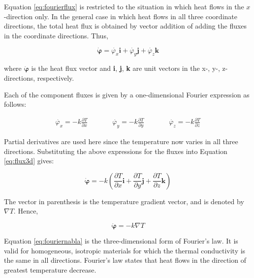 Equation \eqref{eq:fourierflux} is restricted to the situation in which heat flows in the $x$-direction
only. In the general case in which heat flows in all three coordinate directions, the total heat flux is obtained by vector addition of adding the fluxes in the coordinate directions. Thus,

\begin{equation}
	\label{eq:flux3d}
	\boldsymbol{\dot{\varphi}} = \dot{\varphi_x} \mathbf{i} + \dot{\varphi_y} \mathbf{j} + \dot{\varphi_z} \mathbf{k}
\end{equation}

where $\boldsymbol{\dot{\varphi}}$ is the heat flux vector and \textbf{i}, \textbf{j}, \textbf{k} are unit vectors in the x-, y-, z-directions, respectively.

Each of the component fluxes is given by a one-dimensional Fourier expression as follows:

\begin{equation}
	\begin{aligned}
		\label{eq:fourier3d}
		\dot{\varphi_x} = - k \frac{\partial T}{\partial x} & \qquad & \dot{\varphi_y} = - k \frac{\partial T}{\partial y} & \qquad & \dot{\varphi_z} = - k \frac{\partial T}{\partial z}
	\end{aligned}
\end{equation}

Partial derivatives are used here since the temperature now varies in all three directions. Substituting
the above expressions for the fluxes into Equation \eqref{eq:flux3d} gives:

\begin{equation}
	\label{eq:fouriercart}
	\boldsymbol{\dot{\varphi}} = -k \left(\frac{\partial T}{\partial x} \mathbf{i} + \frac{\partial T}{\partial y} \mathbf{j} + \frac{\partial T}{\partial z} \mathbf{k} \right)
\end{equation}

The vector in parenthesis is the temperature gradient vector, and is denoted by $\nabla T$. Hence,

\begin{equation}
	\label{eq:fouriernabla}
	\boldsymbol{\dot{\varphi}} = -k \nabla T
\end{equation}

Equation \eqref{eq:fouriernabla} is the three-dimensional form of Fourier’s law. It is valid for homogeneous, isotropic materials for which the thermal conductivity is the same in all directions. Fourier’s law states that heat flows in the direction of greatest temperature decrease.

